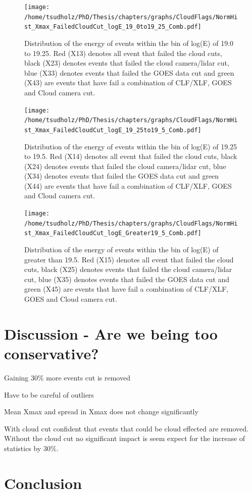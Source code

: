 \begin{figure}
\centering
\texttt{[image: /home/tsudholz/PhD/Thesis/chapters/graphs/CloudFlags/NormHist\_Xmax\_FailedCloudCut\_logE\_19\_0to19\_25\_Comb.pdf]}
\caption{Distribution of the energy of events within the bin of log(E) of 19.0 to 19.25. Red (X13) denotes all event that failed the cloud cuts, black (X23) denotes events that failed the cloud camera/lidar cut, blue (X33) denotes events that failed the GOES data cut and green (X43) are events that have fail a combination of CLF/XLF, GOES and Cloud camera cut.}
\end{figure}

\begin{figure}
\centering
\texttt{[image: /home/tsudholz/PhD/Thesis/chapters/graphs/CloudFlags/NormHist\_Xmax\_FailedCloudCut\_logE\_19\_25to19\_5\_Comb.pdf]}
\caption{Distribution of the energy of events within the bin of log(E) of 19.25 to 19.5. Red (X14) denotes all event that failed the cloud cuts, black (X24) denotes events that failed the cloud camera/lidar cut, blue (X34) denotes events that failed the GOES data cut and green (X44) are events that have fail a combination of CLF/XLF, GOES and Cloud camera cut.}
\end{figure}

\begin{figure}
\centering
\texttt{[image: /home/tsudholz/PhD/Thesis/chapters/graphs/CloudFlags/NormHist\_Xmax\_FailedCloudCut\_logE\_Greater19\_5\_Comb.pdf]}
\caption{Distribution of the energy of events within the bin of log(E) of greater than 19.5. Red (X15) denotes all event that failed the cloud cuts, black (X25) denotes events that failed the cloud camera/lidar cut, blue (X35) denotes events that failed the GOES data cut and green (X45) are events that have fail a combination of CLF/XLF, GOES and Cloud camera cut.}
\end{figure}

\section{Discussion - Are we being too conservative?}

Gaining 30\% more events cut is removed

Have to be careful of outliers

Mean Xmax and spread in Xmax does not change significantly

With cloud cut confident that events that could be cloud effected are removed. Without the cloud cut no significant impact is seem expect for the increase of statistics by 30\%.


\section{Conclusion}
